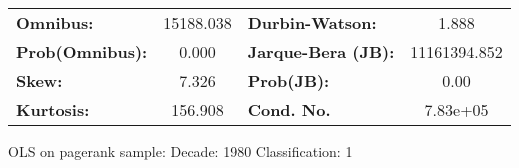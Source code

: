 \begin{center}
\begin{tabular}{lccccc}
\bottomrule
\end{tabular}
\begin{tabular}{lclc}
\textbf{Omnibus:}       & 15188.038 & \textbf{  Durbin-Watson:     } &      1.888    \\
\textbf{Prob(Omnibus):} &    0.000  & \textbf{  Jarque-Bera (JB):  } & 11161394.852  \\
\textbf{Skew:}          &    7.326  & \textbf{  Prob(JB):          } &       0.00    \\
\textbf{Kurtosis:}      &  156.908  & \textbf{  Cond. No.          } &   7.83e+05    \\
\bottomrule
\end{tabular}
\end{center}
\break
OLS on pagerank sample: Decade: 1980 Classification: 1

